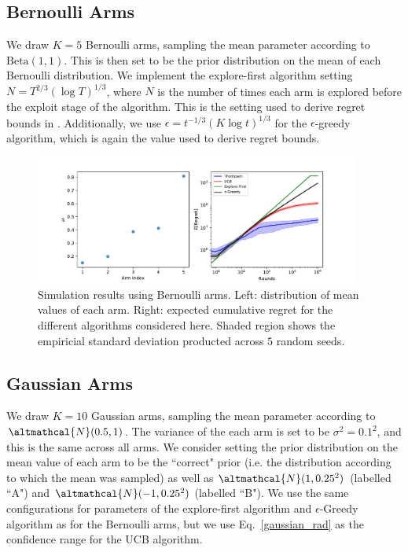 \documentclass[a4paper]{article}
\begin{document}
	\subsection{Bernoulli Arms}
	We draw $K=5$ Bernoulli arms, sampling the mean parameter according to $\text{Beta}(1, 1)$. This is then set to be the prior distribution on the mean of each Bernoulli distribution. We implement the explore-first algorithm setting $N = T^{2/3} (\log T)^{1/3}$, where $N$ is the number of times each arm is explored before the exploit stage of the algorithm. This is the setting used to derive regret bounds in \cite{book}. Additionally,  we use $\epsilon = t^{-1/3} (K \log t)^{1/3}$ for the $\epsilon$-greedy algorithm, which is again the value used to derive regret bounds. 
	\begin{figure}[H]
		\includegraphics[width=0.95\textwidth]{bernoulli}
		\centering
		\caption{\label{bernoulli}Simulation results using Bernoulli arms. Left: distribution of mean values of each arm. Right: expected cumulative regret for the different algorithms considered here. Shaded region shows the empiricial standard deviation producted across $5$ random seeds.}
	\end{figure}

	\subsection{Gaussian Arms}
	We draw $K=10$ Gaussian arms, sampling the mean parameter according to $\altmathcal{N}(0.5, 1)$. The variance of the each arm is set to be $\sigma^2 = 0.1^2$, and this is the same across all arms. We consider setting the prior distribution on the mean value of each arm to be the ``correct" prior (i.e. the distribution according to which the mean was sampled) as well as $\altmathcal{N}(1, 0.25^2)$ (labelled ``A") and $\altmathcal{N}(-1, 0.25^2)$ (labelled ``B").  We use the same configurations for parameters of the explore-first algorithm and $\epsilon$-Greedy algorithm as for the Bernoulli arms, but we use Eq.~\eqref{gaussian_rad} as the confidence range for the UCB algorithm. 
	
\end{document}
